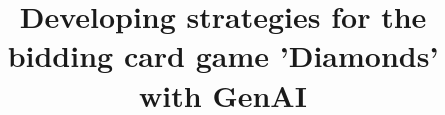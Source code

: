 \documentclass[11pt,twoside,a4paper]{article}
\begin{document}
\title{Developing strategies for the bidding card game 'Diamonds' with GenAI}
\end{document}
